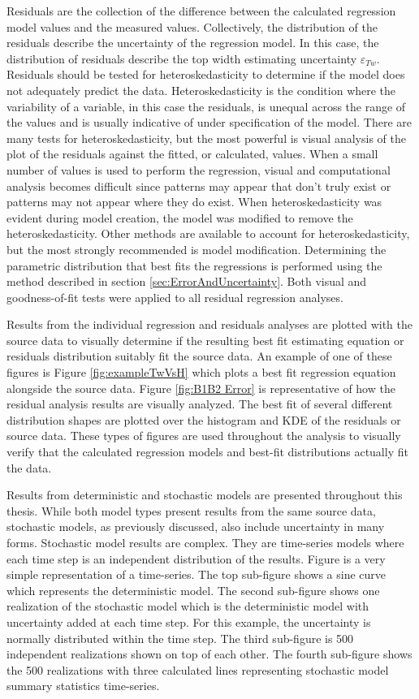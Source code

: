Residuals are the collection of the difference between the calculated regression model values and the measured values.  Collectively, the distribution of the residuals describe the uncertainty of the regression model.  In this case, the distribution of residuals describe the top width estimating uncertainty $ \varepsilon_{Tw} $.  Residuals should be tested for heteroskedasticity to determine if the model does not adequately predict the data.  Heteroskedasticity is the condition where the variability of a variable, in this case the residuals, is unequal across the range of the values and is usually indicative of under specification of the model.  There are many tests for heteroskedasticity, but the most powerful is visual analysis of the plot of the residuals against the fitted, or calculated, values.  When a small number of values is used to perform the regression, visual and computational analysis becomes difficult since patterns may appear that don't truly exist or patterns may not appear where they do exist.  When heteroskedasticity was evident during model creation, the model was modified to remove the heteroskedasticity.  Other methods are available to account for heteroskedasticity, but the most strongly recommended is model modification.  Determining the parametric distribution that best fits the regressions is performed using the method described in section \ref{sec:ErrorAndUncertainty}.  Both visual and goodness-of-fit tests were applied to all residual regression analyses.

Results from the individual regression and residuals analyses are plotted with the source data to visually determine if the resulting best fit estimating equation or residuals distribution suitably fit the source data.  An example of one of these figures is Figure \ref{fig:exampleTwVsH} which plots a best fit regression equation alongside the source data.  Figure \ref{fig:B1B2 Error} is representative of how the residual analysis results are visually analyzed.  The best fit of several different distribution shapes are plotted over the histogram and KDE of the residuals or source data.  These types of figures are used throughout the analysis to visually verify that the calculated regression models and best-fit distributions actually fit the data.

Results from deterministic and stochastic models are presented throughout this thesis.  While both model types present results from the same source data, stochastic models, as previously discussed, also include uncertainty in many forms.  Stochastic model results are complex.  They are time-series models where each time step is an independent distribution of the results.  Figure is a very simple representation of a time-series.  The top sub-figure shows a sine curve which represents the deterministic model.  The second sub-figure shows one realization of the stochastic model which is the deterministic model with uncertainty added at each time step.  For this example, the uncertainty is normally distributed within the time step.  The third sub-figure is 500 independent realizations shown on top of each other.  The fourth sub-figure shows the 500 realizations with three calculated lines representing stochastic model summary statistics time-series.

